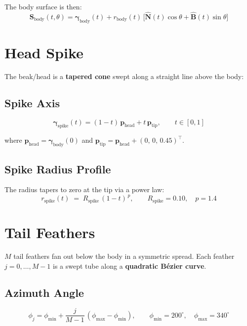\documentclass[12pt,a4paper]{article}
\newcommand{\vv}[1]{\bm{#1}}          %
\begin{document}
The body surface is then:
\begin{equation}
  \vv{S}_{\mathrm{body}}(t,\theta)
  =
  \vv{\gamma}_{\mathrm{body}}(t)
  + r_{\mathrm{body}}(t)\,
  \bigl[\hat{\vv{N}}(t)\cos\theta + \hat{\vv{B}}(t)\sin\theta\bigr]
\end{equation}

\section{Head Spike}

The beak/head is a \textbf{tapered cone} swept along a straight line above
the body:

\subsection{Spike Axis}
\begin{equation}
  \vv{\gamma}_{\mathrm{spike}}(t)
  = (1-t)\,\vv{p}_{\mathrm{head}} + t\,\vv{p}_{\mathrm{tip}},
  \qquad t\in[0,1]
\end{equation}

where $\vv{p}_{\mathrm{head}} = \vv{\gamma}_{\mathrm{body}}(0)$ and
$\vv{p}_{\mathrm{tip}} = \vv{p}_{\mathrm{head}} + (0,\,0,\,0.45)^\top$.

\subsection{Spike Radius Profile}

The radius tapers to zero at the tip via a power law:
\begin{equation}
  r_{\mathrm{spike}}(t)
  \;=\;
  R_{\mathrm{spike}}\,(1-t)^{\,p},
  \qquad
  R_{\mathrm{spike}} = 0.10,\quad p = 1.4
\end{equation}

\section{Tail Feathers}

$M$ tail feathers fan out below the body in a symmetric spread.
Each feather $j=0,\ldots,M{-}1$ is a swept tube along a
\textbf{quadratic Bézier curve}.

\subsection{Azimuth Angle}
\begin{equation}
  \phi_j
  = \phi_{\min}
  + \frac{j}{M-1}\,(\phi_{\max} - \phi_{\min}),
  \qquad
  \phi_{\min} = 200^\circ,\quad
  \phi_{\max} = 340^\circ
\end{equation}
\end{document}
